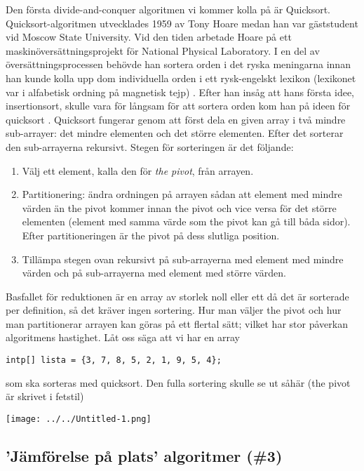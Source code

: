 \documentclass[a4, oneside]{report}
\begin{document}
Den första divide-and-conquer algoritmen vi kommer kolla på är Quicksort. Quicksort-algoritmen utvecklades 1959 av Tony Hoare medan han var gäststudent vid Moscow State University. Vid den tiden arbetade Hoare på ett maskinöversättningsprojekt för National Physical Laboratory. I en del av översättningsprocessen behövde han sortera orden i det ryska meningarna innan han kunde kolla upp dom individuella orden i ett rysk-engelskt lexikon (lexikonet var i alfabetisk ordning på magnetisk tejp) \cite{14}. Efter han insåg att hans första idee, insertionsort, skulle vara för långsam för att sortera orden kom han på ideen för quicksort \cite{15}. Quicksort fungerar genom att först dela en given array i två mindre sub-arrayer: det mindre elementen och det större elementen. Efter det sorterar den sub-arrayerna rekursivt. Stegen för sorteringen är det följande:
\begin{enumerate}
    \item Välj ett element, kalla den för \textit{the pivot}, från arrayen.
    \item Partitionering: ändra ordningen på arrayen sådan att element med mindre värden än the pivot kommer innan the pivot och vice versa för det större elementen (element med samma värde som the pivot kan gå till båda sidor). Efter partitioneringen är the pivot på dess slutliga position. 
    \item Tillämpa stegen ovan rekursivt på sub-arrayerna med element med mindre värden och på sub-arrayerna med element med större värden.
\end{enumerate}
Basfallet för reduktionen är en array av storlek noll eller ett då det är sorterade per definition, så det kräver ingen sortering. Hur man väljer the pivot och hur man partitionerar arrayen kan göras på ett flertal sätt; vilket har stor påverkan algoritmens hastighet. Låt oss säga att vi har en array
\begin{lstlisting}[style=mystyle, numbers=none]
  intp[] lista = {3, 7, 8, 5, 2, 1, 9, 5, 4};
\end{lstlisting}
som ska sorteras med quicksort. Den fulla sortering skulle se ut såhär (the pivot är skrivet i fetstil)
\begin{center}
  \texttt{[image: ../../Untitled-1.png]}
\end{center}



\subsection{'Jämförelse på plats' algoritmer (\#3)}
\end{document}
